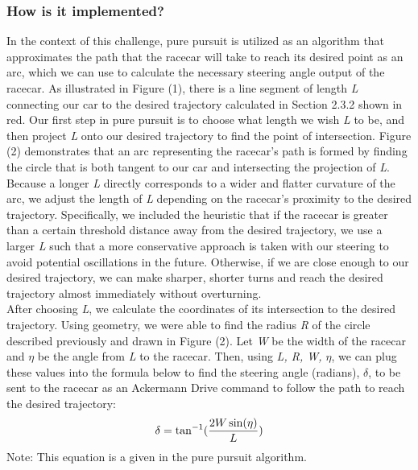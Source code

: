 \documentclass{article}
\begin{document}
\subsubsection{How is it implemented?}
In the context of this challenge, pure pursuit is utilized as an algorithm that approximates the path that the racecar will take to reach its desired point as an arc, which we can use to calculate the necessary steering angle output of the racecar. As illustrated in Figure (1), there is a line segment of length \textit{L} connecting our car to the desired trajectory calculated in Section 2.3.2 shown in red. Our first step in pure pursuit is to choose what length we wish \textit{L} to be, and then project \textit{L} onto our desired trajectory to find the point of intersection. Figure (2) demonstrates that an arc representing the racecar’s path is formed by finding the circle that is both tangent to our car and intersecting the projection of \textit{L}. Because a longer \textit{L} directly corresponds to a wider and flatter curvature of the arc, we adjust the length of \textit{L} depending on the racecar’s proximity to the desired trajectory. Specifically, we included the heuristic that if the racecar is greater than a certain threshold distance away from the desired trajectory, we use a larger \textit{L} such that a more conservative approach is taken with our steering to avoid potential oscillations in the future. Otherwise, if we are close enough to our desired trajectory, we can make sharper, shorter turns and reach the desired trajectory almost immediately without overturning.\\

After choosing \textit{L}, we calculate the coordinates of its intersection to the desired trajectory. Using geometry, we were able to find the radius \textit{R} of the circle described previously and drawn in Figure (2). Let \textit{W} be the width of the racecar and $\eta$ be the angle from \textit{L} to the racecar. Then, using \textit{L, R, W, $\eta$}, we can plug these values into the formula below to find the steering angle (radians), $\delta$, to be sent to the racecar as an Ackermann Drive command to follow the path to reach the desired trajectory:
\[\delta=\tan^{-1}({2W\sin(\eta)\over L})\]
Note: This equation is a given in the pure pursuit algorithm.
\end{document}
